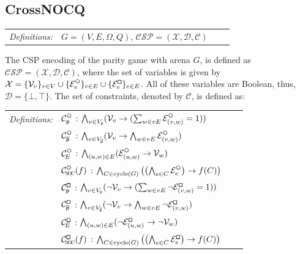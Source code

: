 \documentclass[12pt]{extarticle}
\newcommand{\definition}[1] {
    \begin{tcolorbox}[colback=mygray,colframe=mygray,sharp corners=all,top=0.01cm,bottom=0.01cm,left=0.1cm]
    \small
    \setlength{\tabcolsep}{2pt}
    \begin{tabular}{l l l l}
        \textit{Definitions:} & #1
    \end{tabular}
    \end{tcolorbox}
}
\begin{document}
\subsection{CrossNOCQ}

\definition{
    $G=(V,E, \Omega, Q)$, $\mathcal{CSP} = (\mathcal{X}, \mathcal{D}, \mathcal{C})$
}

The CSP encoding of the parity game with arena $G$, is defined as $\mathcal{CSP = (X, D, C)}$, where the set of variables is given by $\mathcal{X} = \{ \mathcal{V}_v \}_{v \in V} \cup \{ \mathcal{E}^{\subeven}_e \}_{e \in E} \cup \{ \mathcal{E}^{\subodd}_e \}_{e \in E}$. All of these variables are Boolean, thus, $\mathcal{D} = \{\bot,\top\}$. The set of constraints, denoted by $\mathcal{C}$, is defined as:

\definition{
    $\mathcal{C}^{\subeven}_{\player}$ : $\bigwedge_{v \in V_{\player}} (\mathcal{V}_v \rightarrow (\sum_{w \in vE} \mathcal{E}^{\subeven}_{(v,w)}= 1))$

    \\ & $\mathcal{C}^{\subeven}_{\opponent}$ : $\bigwedge_{v \in V_{\opponent}} (\mathcal{V}_v \rightarrow \bigwedge_{w \in vE} \mathcal{E}^{\subeven}_{(v,w)})$

    \\ & $\mathcal{C}^{\subeven}_{\!E}$ : $\bigwedge_{(u,w) \in E} (\mathcal{E}^{\subeven}_{(u,w)} \rightarrow \mathcal{V}_w)$

    \\ & $\mathcal{C}^{\subeven}_{\subnoc}(f)$ : $\bigwedge_{C \in \mathrm{cycle}(G)} \left( \left(\bigwedge_{e \in C} \mathcal{E}^{\subeven}_{e}\right) \to f(C) \right)$

    \\& $\mathcal{C}^{\subodd}_{\player}$ : $\bigwedge_{v \in V_{\player}} (\neg \mathcal{V}_v \rightarrow (\sum_{w \in vE} \neg \mathcal{E}^{\subodd}_{(v,w)}= 1))$

    \\ & $\mathcal{C}^{\subodd}_{\opponent}$ : $\bigwedge_{v \in V_{\opponent}} (\neg \mathcal{V}_v \rightarrow \bigwedge_{w \in vE} \neg \mathcal{E}^{\subodd}_{(v,w)})$

    \\ & $\mathcal{C}^{\subodd}_{\!E}$ : $\bigwedge_{(u,w) \in E} (\neg \mathcal{E}^{\subodd}_{(u,w)} \rightarrow \neg \mathcal{V}_w)$

    \\ & $\mathcal{C}^{\subodd}_{\subnoc}(f)$ : $\bigwedge_{C \in \mathrm{cycle}(G)} \left( \left(\bigwedge_{e \in C} \mathcal{E}^{\subodd}_{e}\right) \to f(C) \right)$
}
\end{document}
